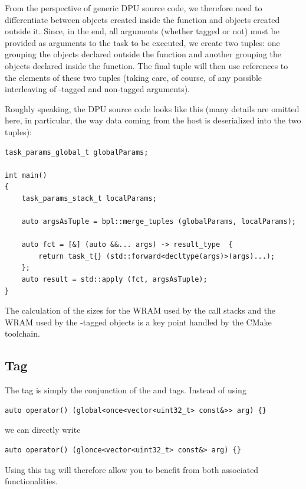 From the perspective of generic DPU source code, we therefore need to differentiate between objects created inside the 
function and objects created outside it. Since, in the end, all arguments (whether tagged  or not) must be provided
as arguments to the task to be executed, we create two tuples: one grouping the objects declared outside the  function
and another grouping the objects declared inside the  function. 
The final tuple will then use references to the elements of these two tuples 
(taking care, of course, of any possible interleaving of -tagged and non-tagged arguments).

Roughly speaking, the DPU source code looks like this (many details are omitted here, 
in particular, the way data coming from the host is deserialized into the two tuples):
\begin{verbatim}
task_params_global_t globalParams;

int main() 
{
    task_params_stack_t localParams;

    auto argsAsTuple = bpl::merge_tuples (globalParams, localParams);

    auto fct = [&] (auto &&... args) -> result_type  {
        return task_t{} (std::forward<decltype(args)>(args)...);
    };
    auto result = std::apply (fct, argsAsTuple);
}
\end{verbatim}


The calculation of the sizes for the WRAM used by the call stacks and the WRAM used by the -tagged objects 
is a key point handled by the CMake toolchain.
   
 
\subsection{Tag }

The  tag is simply the conjunction of the  and  tags.
Instead of using
\begin{verbatim}
auto operator() (global<once<vector<uint32_t> const&>> arg) {}  
\end{verbatim}
we can directly write
\begin{verbatim}
auto operator() (glonce<vector<uint32_t> const&> arg) {}  
\end{verbatim}
Using this tag will therefore allow you to benefit from both associated functionalities.


